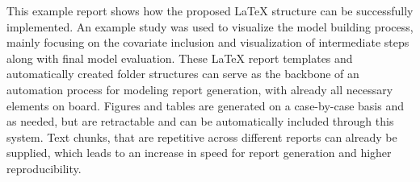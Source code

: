 This example report shows how the proposed \LaTeX{} structure can be successfully implemented. An example study was used to visualize the model building process, mainly focusing on the covariate inclusion and visualization of intermediate steps along with final model evaluation.
These \LaTeX{} report templates and automatically created folder structures can serve as the backbone of an automation process for modeling report generation, with already all necessary elements on board. Figures and tables are generated on a case-by-case basis and as needed, but are retractable and can be automatically included through this system.
Text chunks, that are repetitive across different reports can already be supplied, which leads to an increase in speed for report generation and higher reproducibility.
  
